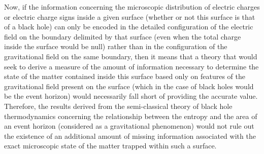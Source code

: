 \documentclass[notitlepage,12pt]{report}
\begin{document}
Now, if the information concerning the microscopic distribution of electric charges or electric charge signs inside a given surface (whether or not this surface is that of a black hole) can only be encoded in the detailed configuration of the electric field on the boundary delimited by that surface (even when the total charge inside the surface would be null) rather than in the configuration of the gravitational field on the same boundary, then it means that a theory that would seek to derive a measure of the amount of information necessary to determine the state of the matter contained inside this surface based only on features of the gravitational field present on the surface (which in the case of black holes would be the event horizon) would necessarily fall short of providing the accurate value. Therefore, the results derived from the semi-classical theory of black hole thermodynamics concerning the relationship between the entropy and the area of an event horizon (considered as a gravitational phenomenon) would not rule out the existence of an additional amount of missing information associated with the exact microscopic state of the matter trapped within such a surface.
\end{document}

